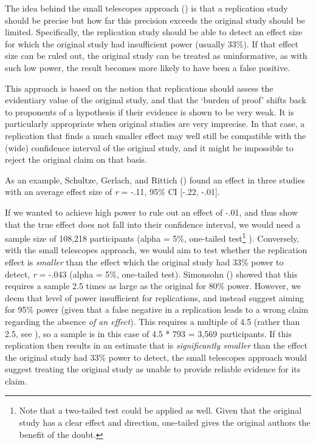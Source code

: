 \documentclass[
  letterpaper,
  DIV=11,
  openany,
  fontsize=12pt,
  parskip=half,
  headings=big,
  numbers=noenddot,
  titlepage=false]{scrreprt}
\begin{document}
The idea behind the small telescopes approach
() is that a replication
study should be precise but how far this precision exceeds the original
study should be limited. Specifically, the replication study should be
able to detect an effect size for which the original study had
insufficient power (usually 33\%). If that effect size can be ruled out,
the original study can be treated as uninformative, as with such low
power, the result becomes more likely to have been a false positive.

This approach is based on the notion that replications should assess the
evidentiary value of the original study, and that the `burden of proof'
shifts back to proponents of a hypothesis if their evidence is shown to
be very weak. It is particularly appropriate when original studies are
very imprecise. In that case, a replication that finds a much smaller
effect may well still be compatible with the (wide) confidence interval
of the original study, and it might be impossible to reject the original
claim on that basis.

As an example, Schultze, Gerlach, and Rittich
() found an effect in three
studies with an average effect size of \emph{r} = -.11, 95\% CI {[}-.22,
-.01{]}.

If we wanted to achieve high power to rule out an effect of -.01, and
thus show that the true effect does not fall into their confidence
interval, we would need a sample size of 108,218 participants (alpha =
5\%, one-tailed test\footnote{Note that a two-tailed test could be
  applied as well. Given that the original study has a clear effect and
  direction, one-tailed gives the original authors the benefit of the
  doubt.} ). Conversely, with the small telescopes approach, we would
aim to test whether the replication effect is \emph{smaller} than the
effect which the original study had 33\% power to detect, \emph{r }=
-.043 (alpha = 5\%, one-tailed test). Simonsohn
() showed that this requires a sample
2.5 times as large as the original for 80\% power. However, we deem that
level of power insufficient for replications, and instead suggest aiming
for 95\% power (given that a false negative in a replication leads to a
wrong claim regarding the absence \emph{of an effect}). This requires a
multiple of 4.5 (rather than 2.5, see
), so a sample is in this case
of 4.5 * 793 = 3,569 participants. If this replication then results in
an estimate that is \emph{significantly smaller }than the effect the
original study had 33\% power to detect, the small telescopes approach
would suggest treating the original study as unable to provide reliable
evidence for its claim.
\end{document}
